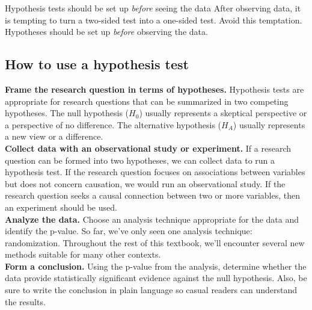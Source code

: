 \begin{caution}{Hypothesis tests should be set up \emph{before} seeing the data}
{After observing data, it is tempting to turn a two-sided test into a one-sided test. Avoid this temptation. Hypotheses should be set up \emph{before} observing the data.}
\end{caution}




\subsection{How to use a hypothesis test}

\noindent\textbf{Frame the research question in terms of hypotheses.} Hypothesis tests are appropriate for research questions that can be summarized in two competing hypotheses. The null hypothesis ($H_0$) usually represents a skeptical perspective or a perspective of no difference. The alternative hypothesis ($H_A$) usually represents a new view or a difference. \\

\noindent\textbf{Collect data with an observational study or experiment.} If a research question can be formed into two hypotheses, we can collect data to run a hypothesis test. If the research question focuses on associations between variables but does not concern causation, we would run an observational study. If the research question seeks a causal connection between two or more variables, then an experiment should be used. \\

\noindent\textbf{Analyze the data.} Choose an analysis technique appropriate for the data and identify the p-value. So far, we've only seen one analysis technique: randomization. Throughout the rest of this textbook, we'll encounter several new methods suitable for many other contexts. \\

\noindent\textbf{Form a conclusion.} Using the p-value from the analysis, determine whether the data provide statistically significant evidence against the null hypothesis. Also, be sure to write the conclusion in plain language so casual readers can understand the results.




